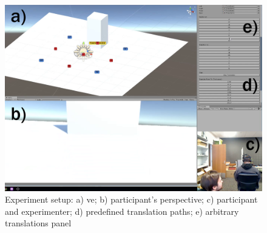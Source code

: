 \begin{figure}
	\centering
	\includegraphics[width=\linewidth]{figures/pilot1_experiment_setup.png}
	\caption{Experiment setup: a) \gls{ve}; b) participant's perspective; c) participant and experimenter; d) predefined translation paths; e) arbitrary translations panel}
	\label{fig:clipimage001}
\end{figure}

